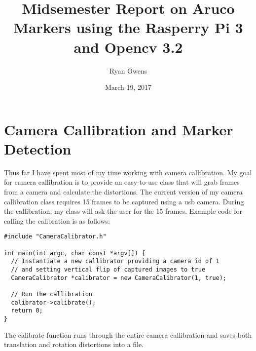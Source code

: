 \documentclass[twoside]{report}
\begin{document}
  \begin{titlepage}
    \title{Midsemester Report on Aruco Markers using the Rasperry Pi 3 and Opencv 3.2}
    \date{March 19, 2017}
    \author{Ryan Owens}
    \maketitle
  \end{titlepage}
  \section{Camera Callibration and Marker Detection}
    Thus far I have spent most of my time working with camera callibration. My goal
    for camera callibration is to provide an easy-to-use class that will grab
    frames from a camera and calculate the distortions.  The current version of
    my camera callibration class requires 15 frames to be captured using a usb
    camera. During the callibration, my class will ask the user for the 15 frames.
    Example code for calling the calibration is as follows:
    \begin{lstlisting}
#include "CameraCalibrator.h"

int main(int argc, char const *argv[]) {
  // Instantiate a new callibrator providing a camera id of 1
  // and setting vertical flip of captured images to true
  CameraCalibrator *calibrator = new CameraCalibrator(1, true);

  // Run the callibration
  calibrator->calibrate();
  return 0;
}
    \end{lstlisting}
    The calibrate function runs through the entire camera callibration and saves
    both translation and rotation distortions into a file.
\end{document}
